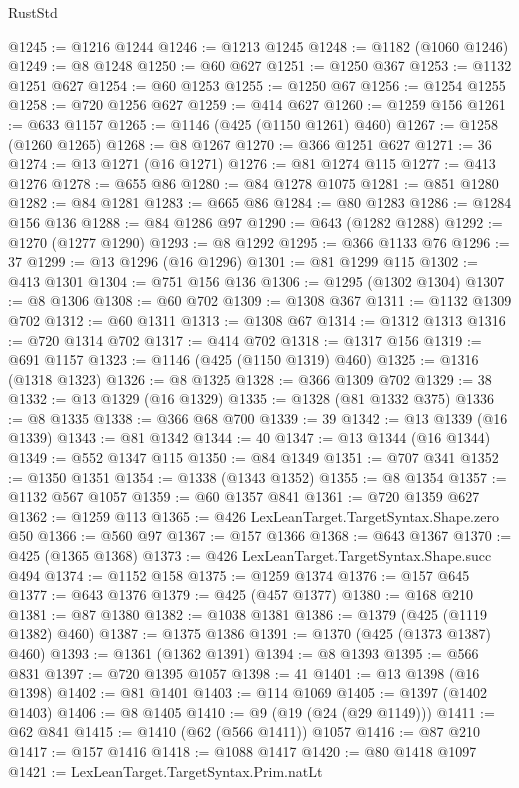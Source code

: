 \begin{lexlean}{RustStd}
\begin{coremodule}
{\begin{coremodule}
{{{{{{{{{{{{{{{{{{{{{{{{{{{{{{{{{{{{{{{{{{{{{{{{{{{{{@1245 := @1216 @1244
@1246 := @1213 @1245
@1248 := @1182 (@1060 @1246)
@1249 := @8 @1248
@1250 := @60 @627
@1251 := @1250 @367
@1253 := @1132 @1251 @627
@1254 := @60 @1253
@1255 := @1250 @67
@1256 := @1254 @1255
@1258 := @720 @1256 @627
@1259 := @414 @627
@1260 := @1259 @156
@1261 := @633 @1157
@1265 := @1146 (@425 (@1150 @1261) @460)
@1267 := @1258 (@1260 @1265)
@1268 := @8 @1267
@1270 := @366 @1251 @627
@1271 := 36
@1274 := @13 @1271 (@16 @1271)
@1276 := @81 @1274 @115
@1277 := @413 @1276
@1278 := @655 @86
@1280 := @84 @1278 @1075
@1281 := @851 @1280
@1282 := @84 @1281
@1283 := @665 @86
@1284 := @80 @1283
@1286 := @1284 @156 @136
@1288 := @84 @1286 @97
@1290 := @643 (@1282 @1288)
@1292 := @1270 (@1277 @1290)
@1293 := @8 @1292
@1295 := @366 @1133 @76
@1296 := 37
@1299 := @13 @1296 (@16 @1296)
@1301 := @81 @1299 @115
@1302 := @413 @1301
@1304 := @751 @156 @136
@1306 := @1295 (@1302 @1304)
@1307 := @8 @1306
@1308 := @60 @702
@1309 := @1308 @367
@1311 := @1132 @1309 @702
@1312 := @60 @1311
@1313 := @1308 @67
@1314 := @1312 @1313
@1316 := @720 @1314 @702
@1317 := @414 @702
@1318 := @1317 @156
@1319 := @691 @1157
@1323 := @1146 (@425 (@1150 @1319) @460)
@1325 := @1316 (@1318 @1323)
@1326 := @8 @1325
@1328 := @366 @1309 @702
@1329 := 38
@1332 := @13 @1329 (@16 @1329)
@1335 := @1328 (@81 @1332 @375)
@1336 := @8 @1335
@1338 := @366 @68 @700
@1339 := 39
@1342 := @13 @1339 (@16 @1339)
@1343 := @81 @1342
@1344 := 40
@1347 := @13 @1344 (@16 @1344)
@1349 := @552 @1347 @115
@1350 := @84 @1349
@1351 := @707 @341
@1352 := @1350 @1351
@1354 := @1338 (@1343 @1352)
@1355 := @8 @1354
@1357 := @1132 @567 @1057
@1359 := @60 @1357 @841
@1361 := @720 @1359 @627
@1362 := @1259 @113
@1365 := @426 LexLeanTarget.TargetSyntax.Shape.zero @50
@1366 := @560 @97
@1367 := @157 @1366
@1368 := @643 @1367
@1370 := @425 (@1365 @1368)
@1373 := @426 LexLeanTarget.TargetSyntax.Shape.succ @494
@1374 := @1152 @158
@1375 := @1259 @1374
@1376 := @157 @645
@1377 := @643 @1376
@1379 := @425 (@457 @1377)
@1380 := @168 @210
@1381 := @87 @1380
@1382 := @1038 @1381
@1386 := @1379 (@425 (@1119 @1382) @460)
@1387 := @1375 @1386
@1391 := @1370 (@425 (@1373 @1387) @460)
@1393 := @1361 (@1362 @1391)
@1394 := @8 @1393
@1395 := @566 @831
@1397 := @720 @1395 @1057
@1398 := 41
@1401 := @13 @1398 (@16 @1398)
@1402 := @81 @1401
@1403 := @114 @1069
@1405 := @1397 (@1402 @1403)
@1406 := @8 @1405
@1410 := @9 (@19 (@24 (@29 @1149)))
@1411 := @62 @841
@1415 := @1410 (@62 (@566 @1411)) @1057
@1416 := @87 @210
@1417 := @157 @1416
@1418 := @1088 @1417
@1420 := @80 @1418 @1097
@1421 := LexLeanTarget.TargetSyntax.Prim.natLt
}}}}}}}}}}}}}}}}}}}}}}}}}}}}}}}}}}}}}}}}}}}}}}}}}}}}}
\end{coremodule}}
\end{coremodule}
\end{lexlean}
